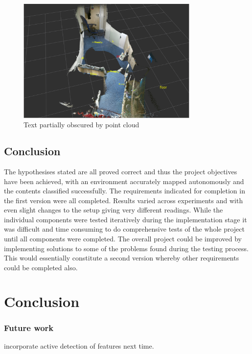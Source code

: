 \documentclass{mproj}
\begin{document}
 \begin{figure}
   \caption{Text partially obscured by point cloud}
   \centering
   \includegraphics[width=0.8\textwidth]{images/ex3pc.png}
   \hfill
\end{figure}

\section{Conclusion}

The hypothesises stated are all proved correct and thus the project objectives have been achieved, with an environment accurately mapped autonomously and the contents classified successfully. The requirements indicated for completion in the first version were all completed. Results varied across experiments and with even slight changes to the setup giving very different readings. While the individual components were tested iteratively during the implementation stage it was difficult and time consuming to do comprehensive tests of the whole project until all components were completed. The overall project could be improved by implementing solutions to some of the problems found during the testing process. This would essentially constitute a  second version whereby other requirements could be completed also. 

\chapter{Conclusion}\label{conclusion}
\subsection{Future work}

incorporate active detection of features next time.
\end{document}
